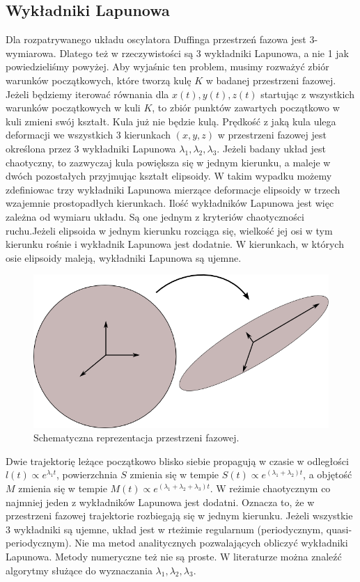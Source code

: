 \documentclass[a4paper,12pt,polish]{sphinxmanual}
\begin{document}
\subsection{Wykładniki Lapunowa}
\label{ch2/chII012:wykladniki-lapunowa}
Dla rozpatrywanego układu oscylatora Duffinga przestrzeń fazowa jest 3-wymiarowa. Dlatego też w rzeczywistości są 3 wykładniki Lapunowa, a nie 1 jak powiedzieliśmy powyżej.  Aby wyjaśnic ten problem, musimy rozważyć  zbiór warunków początkowych, które tworzą  kulę  $K$ w  badanej przestrzeni fazowej.  Jeżeli będziemy iterować równania dla $x(t), y(t), z(t)$ startując z wszystkich warunków początkowych w kuli $K$,  to zbiór punktów zawartych początkowo w kuli zmieni swój kształt. Kula już nie będzie kulą. Prędkość z jaką  kula ulega deformacji we wszystkich 3 kierunkach $(x, y, z)$ w przestrzeni fazowej  jest określona przez 3 wykładniki Lapunowa $\lambda_1, \lambda_2, \lambda_3$. Jeżeli badany układ jest chaotyczny, to zazwyczaj kula powiększa się w jednym kierunku, a maleje w dwóch pozostałych przyjmując kształt elipsoidy. W takim wypadku możemy zdefiniowac trzy wykładniki Lapunowa mierzące deformacje elipsoidy w trzech wzajemnie prostopadłych kierunkach. Ilość wykładników Lapunowa jest więc zależna od wymiaru układu. Są one jednym z kryteriów chaotyczności ruchu.Jeżeli elipsoida w jednym kierunku rozciąga się, wielkość jej osi w tym kierunku rośnie i wykładnik Lapunowa jest dodatnie. W kierunkach, w których osie elipsoidy maleją, wykładniki Lapunowa są ujemne.
\begin{figure}[htbp]
\centering
\capstart

\includegraphics{phspace.png}
\caption{Schematyczna reprezentacja przestrzeni fazowej.}\end{figure}

Dwie trajektorię leżące początkowo blisko siebie propagują w czasie w odległości   $l(t)   \propto e^{\lambda_1 t}$, powierzchnia  $S$ zmienia się w tempie $S(t)  \propto e^{(\lambda_1 + \lambda_2) t}$, a objętość  $M$ zmienia się w tempie $M(t)  \propto e^{(\lambda_1 + \lambda_2 + \lambda_3) t}$. W reżimie chaotycznym co najmniej jeden z wykładników Lapunowa jest dodatni. Oznacza to, że w przestrzeni fazowej trajektorie rozbiegają się w jednym kierunku. Jeżeli wszystkie 3 wykładniki są ujemne, układ jest w rteżimie regularnum (periodycznym, quasi-periodycznym). Nie ma metod analitycznych pozwalających obliczyć wykładniki Lapunowa. Metody numeryczne też nie są proste. W literaturze można znaleźć algorytmy służące do wyznaczania $\lambda_1, \lambda_2, \lambda_3$.
\end{document}
